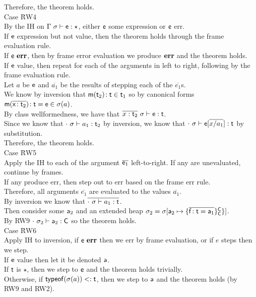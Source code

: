 \documentclass{report}
\newcommand{\m}{\M{\xt{m}}}
\newcommand{\e}{\M{\xt{e}}}
\newcommand{\f}{\M{\xt{f}}}
\newcommand{\x}{\M{\xt{x}}}
\renewcommand{\t}{\M{\xt{t}}}
\newcommand{\C}{\M{\xt{C}}}
\newcommand{\err}{\M{\bt{err}}}
\newcommand{\s}{\M{\sigma}}
\renewcommand{\a}{\M{\xt a}}
\newcommand{\tp}[1]{\M{ \t_{#1} }}
\newcommand{\ap}[1]{\M{ \a_{#1} }}
\renewcommand{\sp}[1]{\M{ \s_{#1} }}
\newcommand{\any}{\M{\star}}
\newcommand{\HT}[2]{\M{{#1}\!:{#2}}}
\newcommand{\Mdef}[5]{\M{ \HT { #1( \b{\HT{#2}{#3}})}{#4}={#5}}}
\newcommand{\Fdef}[3]{\M{ \HT{#1}{#2}={#3} }}
\newcommand{\Mtype}[3]{\M{ \HT { #1( #2 )}{#3}}}
\newcommand{\is}{\M{\mapsto}}
\newcommand{\Obj}[3]{ \M{\{ #1 \}^{#2}_{#3}}}
\newcommand{\Heap}[2]{\M{ #1[ #2 ] }}
\newcommand{\M}[1]{\ensuremath{#1}\xspace}
\newcommand{\xt}[1]{{\sf{#1}}\xspace}
\newcommand{\bt}[1]{\xt{\bf #1}}
\renewcommand{\b}[1]{\M{\overline{#1}}}
\newcommand{\Bind}[2]{\M{#1 \is #2}}
\newcommand{\Sub}{\M{<:}}
\newcommand{\typeof}[1]{\M{\xt{typeof}(#1)}}
\newcommand{\EnvType}[3]{ \M{#1 \vdash #2 : #3}}
\newcommand{\E}{\M{\Gamma}}
\newcommand{\Es}{\E ~\s}
\begin{document}
\begin{tabbing}
\> \> \> Therefore, the theorem holds. \\
Case \=RW4 \\
\> By the IH on $\EnvType\Es\e\any$, either $\e$ some expression or $\e$ err. \\
\> If $\e$ expression but not value, then the theorem holds through the frame evaluation rule. \\
\> If $\e~\err$, then by frame error evaluation we produce $\err$ and the theorem holds. \\
\> If $\e$ value, then repeat for each of the arguments in left to right, following by the frame evaluation rule. \\
\> Let $a$ be $\e$ and $\b{a_1}$ be the results of stepping each of the $\b{e_1}$s.\\
\> We know by inversion that $\Mtype\m{\tp2}{\t}\in\tp1$ so by canonical forms $\Mdef\m\x{\tp2}\t\e \in \s(a)$. \\
\> By class wellformedness, we have that $\EnvType{\b{x:\tp2}~\s}\e\t$.\\
\> Since we know that $\EnvType{\cdot~\s}{a_1}{\tp2}$ by inversion, we know that $\EnvType{\cdot~\s}{\e[\b{x/a_1}]}\t$ by substitution.\\
\> Therefore, the theorem holds. \\
Case \=RW5 \\
\> Apply the IH to each of the argument $\b{\e_1}$ left-to-right. If any are unevaluated, continue by frames.\\
\> If any produce err, then step out to err based on the frame err rule.\\
\> Therefore, all arguments $\b{e_1}$ are evaluated to the values $\b{a_1}$.\\
\> By inversion we know that $\b{\EnvType{\cdot~\s}{a_1}{\t}}$.\\
\> Then consider some $\ap2$ and an extended heap $\sp 2 = \Heap{\s}{ \Bind{\ap 2}{\Obj{\b{\Fdef\f\t\a_1}}\C\C\}}}$.\\
\> By RW9 $\EnvType{\cdot~\sp2}{\ap2}{\C}$ so the theorem holds.\\
Case \=RW6 \\
\> Apply IH to inversion, if $\e~\err$ then we err by frame evaluation, or if $e$ steps then we step.\\
\> If $\e$ value then let it be denoted $\a$.\\
\> If $\t$ is $\any$, then we step to $\e$ and the theorem holds trivially.\\
\> Otherwise, if $\typeof{\s(a)} \Sub \t$, then we step to $\a$ and the theorem holds (by RW9 and RW2).\\

\end{tabbing}
\end{document}
